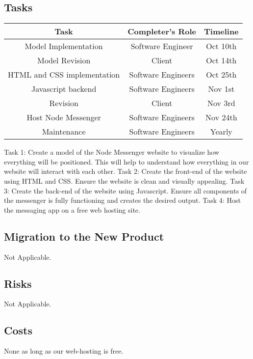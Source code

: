 \documentclass[12pt, titlepage]{article}
\begin{document}
    	\subsection{Tasks}
    	\begin{center}
    		\begin{tabular}{|c|c|c|}
    		\hline 
    		Task & Completer's Role & Timeline \\ 
    		\hline 
    		Model Implementation & Software Engineer & Oct 10th \\ 
    		\hline 
    		Model Revision & Client & Oct 14th \\ 
    		\hline 
    		HTML and CSS implementation & Software Engineers & Oct 25th \\ 
    		\hline 
    		Javascript backend & Software Engineers &  Nov 1st\\ 
    		\hline 
    		Revision & Client & Nov 3rd \\ 
    		\hline 
    		Host Node Messenger& Software Engineers & Nov 24th \\ 
    		\hline 
    		Maintenance & Software Engineers & Yearly \\ 
    		\hline 
    	\end{tabular} 
    	\end{center}
		Task 1: Create a model of the Node Messenger website to visualize how everything will be positioned. This will help to understand how everything in our website will interact with each other. Task 2: Create the front-end of the website using HTML and CSS. Ensure the website is clean and visually appealing. Task 3: Create the back-end of the website using Javascript. Ensure all components of the messenger is fully functioning and creates the desired output. Task 4: Host the messaging app on a free web hosting site.

    	\subsection{Migration to the New Product}
    	Not Applicable.

    	\subsection{Risks}
    	Not Applicable.

    	\subsection{Costs}
    	None as long as our web-hosting is free.
\end{document}
